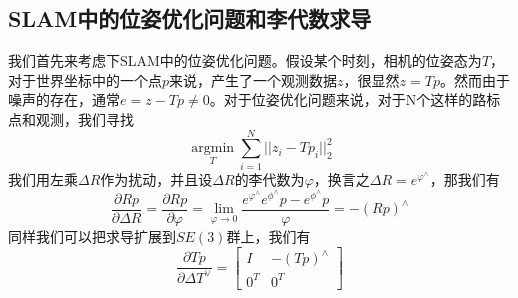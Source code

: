 \subsection{SLAM中的位姿优化问题和李代数求导}
我们首先来考虑下SLAM中的位姿优化问题。假设某个时刻，相机的位姿态为\(T\)，对于世界坐标中的一个点\(p\)来说，产生了一个观测数据\(z\)，很显然\(z=Tp\)。然而由于噪声的存在，通常\(e = z-Tp \neq 0\)。对于位姿优化问题来说，对于N个这样的路标点和观测，我们寻找
\[
    \mathop{argmin}\limits_{T} \sum_{i=1}^N ||z_i - Tp_i||^2_2
\]
我们用左乘\(\Delta R\)作为扰动，并且设\(\Delta R\)的李代数为\(\varphi\)，换言之\(\Delta R = e^{\varphi^\wedge}\)，那我们有
\[
    \frac{\partial Rp}{\partial \Delta R} = \frac{\partial Rp}{\partial \varphi} = \mathop{lim}\limits_{\varphi \rightarrow 0}\frac{e^{\varphi^\wedge} e^{\phi^\wedge} p - e^{\phi^\wedge} p}{\varphi} = -(Rp)^\wedge
\]
同样我们可以把求导扩展到\(SE(3)\)群上，我们有
\[
    \frac{\partial Tp}{\partial \Delta T^\vee} = \begin{bmatrix}I & -(Tp)^\wedge \\ 0^T & 0^T\end{bmatrix}
\]